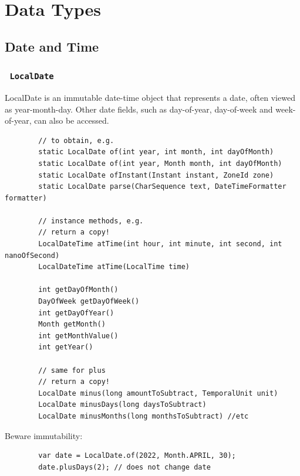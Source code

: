\documentclass{scrartcl}
\begin{document}

\section{Data Types}

\subsection{Date and Time}

\subsubsection{\lstinline$ LocalDate $}

    LocalDate is an immutable date-time object that represents a date, often viewed as year-month-day. Other date fields, such as day-of-year, day-of-week and week-of-year, can also be accessed.

    \begin{lstlisting}
        // to obtain, e.g.
        static LocalDate of(int year, int month, int dayOfMonth)
        static LocalDate of(int year, Month month, int dayOfMonth)
        static LocalDate ofInstant(Instant instant, ZoneId zone)
        static LocalDate parse(CharSequence text, DateTimeFormatter formatter)

        // instance methods, e.g.
        // return a copy!
        LocalDateTime atTime(int hour, int minute, int second, int nanoOfSecond)
        LocalDateTime atTime(LocalTime time)

        int getDayOfMonth()
        DayOfWeek getDayOfWeek()
        int getDayOfYear()
        Month getMonth()
        int getMonthValue()
        int getYear()

        // same for plus
        // return a copy!
        LocalDate minus(long amountToSubtract, TemporalUnit unit)
        LocalDate minusDays(long daysToSubtract)
        LocalDate minusMonths(long monthsToSubtract) //etc
    \end{lstlisting}

    Beware immutability:
    \begin{lstlisting}
        var date = LocalDate.of(2022, Month.APRIL, 30);
        date.plusDays(2); // does not change date
    \end{lstlisting}
\end{document}
